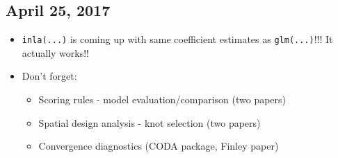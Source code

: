 \documentclass{article}
\begin{document}
\subsection*{April 25, 2017}
\begin{itemize}
\item \verb|inla(...)| is coming up with same coefficient estimates as \verb|glm(...)|!!! It actually works!!
\item Don't forget:
  \begin{itemize}
  \item Scoring rules - model evaluation/comparison (two papers)
  \item Spatial design analysis - knot selection (two papers)
  \item Convergence diagnostics (CODA package, Finley paper)
  \end{itemize}
\end{itemize}
\end{document}
